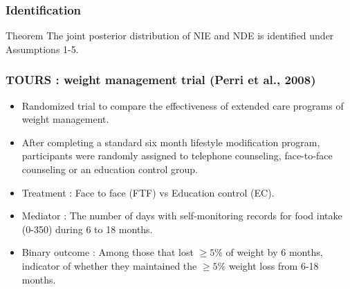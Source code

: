 \documentclass{beamer}
\begin{document}
\begin{frame}
\frametitle{Identification}
\begin{block}{Theorem}
The joint posterior distribution of NIE and
NDE is identified under Assumptions 1-5.
\end{block}


\end{frame}





\begin{frame}
\frametitle{TOURS : weight management trial (Perri et al., 2008)}
\begin{itemize}
\item Randomized trial to compare the effectiveness of
extended care programs of weight management.
\item After completing a standard
six month lifestyle modification program, participants were randomly
assigned to telephone counseling, face-to-face counseling or an
education control group.
\item {\color{red} Treatment} : Face to face (FTF) vs Education
  control (EC).
\item {\color{red} Mediator} : The number of days with self-monitoring
  records for food intake (0-350) during 6 to 18 months.
\item {\color{red} Binary outcome} : Among those that lost $\geq 5\%$ of weight by 6
    months, indicator of whether they maintained the $\geq 5\%$ weight
    loss from 6-18 months.
\end{itemize}
\end{frame}


\end{document}

